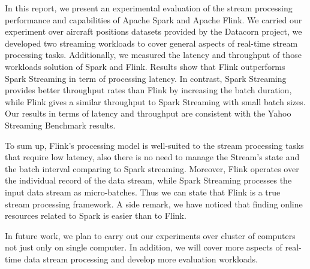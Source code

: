 \documentclass[]{article}
\begin{document}
\label{sec:sec5}
In this report, we present an experimental evaluation of the stream processing performance and capabilities of Apache Spark and Apache Flink. We carried our experiment over aircraft positions datasets provided by the Datacorn project, we developed two streaming workloads to cover general aspects of real-time stream processing tasks. Additionally,  we measured the latency and throughput of those workloads solution of Spark and Flink. Results show that Flink outperforms Spark Streaming in term of processing latency. In contrast, Spark Streaming provides better throughput rates than Flink by increasing the batch duration, while Flink gives a similar throughput to Spark Streaming with small batch sizes.  Our results in terms of latency and throughput are consistent with the Yahoo Streaming Benchmark results. 
\par To sum up, Flink's processing model is well-suited to the stream processing tasks that require low latency, also there is no need to manage the Stream's state and the batch interval comparing to Spark streaming. Moreover, Flink operates over the individual record of the data stream, while Spark Streaming  processes the input data stream as micro-batches. Thus we can state that  Flink is a true stream processing framework. A side remark, we have  noticed that finding online resources related to Spark is easier than to Flink.

In future work, we plan to carry out our experiments over cluster of computers not just only on single computer. In addition, we will cover more aspects of real-time data stream processing and develop more evaluation workloads. 
\end{document}
